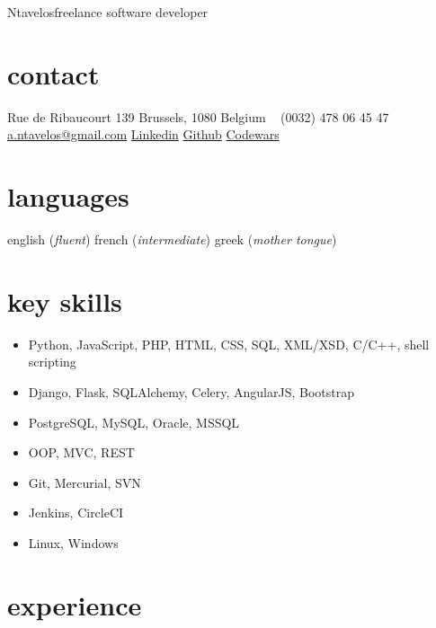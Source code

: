 \documentclass[]{friggeri-cv} %
\begin{document}
 {Ntavelos}{freelance software developer} %


\begin{aside} %
\section{contact}
Rue de Ribaucourt 139
Brussels, 1080
Belgium
~
(0032) 478 06 45 47
~
\href{mailto:a.ntavelos@gmail.com}{a.ntavelos@gmail.com}
\href{http://www.linkedin.com/in/antavelos}{Linkedin}
\href{https://github.com/antavelos}{Github}
\href{http://www.codewars.com/users/dvc}{Codewars}
\section{languages}
english (\textit{fluent})
french (\textit{intermediate})
greek (\textit{mother tongue})
\end{aside}


\section{key skills}
\begin{itemize}
\item Python, JavaScript, PHP, HTML, CSS, SQL, XML/XSD, C/C++, shell scripting
\item Django, Flask, SQLAlchemy, Celery, AngularJS, Bootstrap
\item PostgreSQL, MySQL, Oracle, MSSQL
\item OOP, MVC, REST
\item Git, Mercurial, SVN
\item Jenkins, CircleCI
\item Linux, Windows
\end{itemize}

\section{experience}
\end{document}
